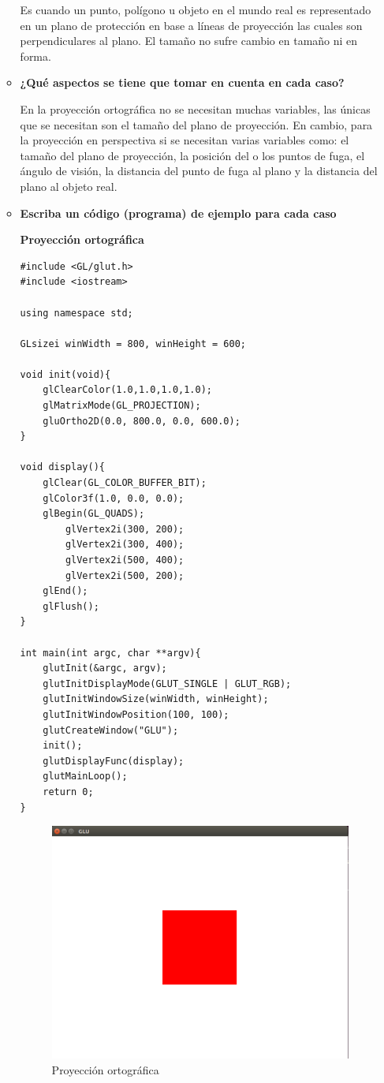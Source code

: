 \documentclass[a4paper,12pt]{article}
\begin{document}
\begin{enumerate}
\begin{itemize}
  Es cuando un punto, polígono u objeto en el mundo real es representado en un plano de protección en base a líneas de proyección las cuales son perpendiculares al plano.
  El tamaño no sufre cambio en tamaño ni en forma.
  \item \textbf{¿Qué aspectos se tiene que tomar en cuenta en cada caso?}
  
  En la proyección ortográfica no se necesitan muchas variables, las únicas que se necesitan son el tamaño del plano de proyección. En cambio, para la proyección en
  perspectiva si se necesitan varias variables como: el tamaño del plano de proyección, la posición del o los puntos de fuga, el ángulo de visión, la distancia del
  punto de fuga al plano y la distancia del plano al objeto real.
  \item \textbf{Escriba un código (programa) de ejemplo para cada caso}
  
  \textbf{Proyección ortográfica}
  \begin{lstlisting}
#include <GL/glut.h>
#include <iostream>

using namespace std;

GLsizei winWidth = 800, winHeight = 600;

void init(void){
    glClearColor(1.0,1.0,1.0,1.0);
    glMatrixMode(GL_PROJECTION);
    gluOrtho2D(0.0, 800.0, 0.0, 600.0);
}

void display(){
	glClear(GL_COLOR_BUFFER_BIT);
	glColor3f(1.0, 0.0, 0.0);
	glBegin(GL_QUADS);
		glVertex2i(300, 200);
		glVertex2i(300, 400);
		glVertex2i(500, 400);
		glVertex2i(500, 200);
	glEnd();
	glFlush();
}

int main(int argc, char **argv){
    glutInit(&argc, argv);
    glutInitDisplayMode(GLUT_SINGLE | GLUT_RGB);
    glutInitWindowSize(winWidth, winHeight);
    glutInitWindowPosition(100, 100);
    glutCreateWindow("GLU");
    init();
    glutDisplayFunc(display);
    glutMainLoop();
    return 0;
}
  \end{lstlisting}
  \begin{figure}[H]
   \centering
   \includegraphics[scale = 0.5]{4.png}
   \caption{Proyección ortográfica}
  \end{figure}


\end{itemize}
\end{enumerate}
\end{document}
